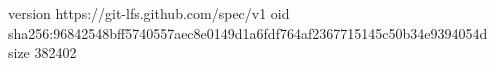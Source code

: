 version https://git-lfs.github.com/spec/v1
oid sha256:96842548bff5740557aec8e0149d1a6fdf764af2367715145c50b34e9394054d
size 382402
